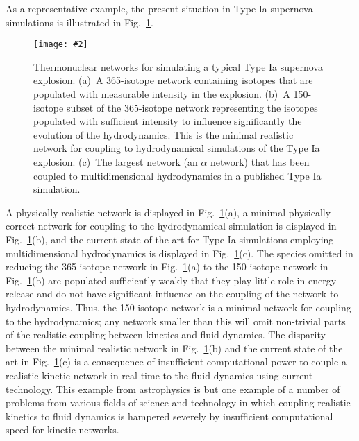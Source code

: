 \documentclass[]{elsart}
\newlength{\figdn}
\newcommand{\fig}[1]{Fig.~\ref{fig:#1}}
\newcommand{\singlefig}[6]{%
\begin{figure} \vspace{#3}%
\begin{flushright}%
\texttt{[image: \#2]}%
\end{flushright}%
\caption{\label{fig:#1} #6}%
\vspace{#4}%
\end{figure}}
\begin{document}
As a representative example, the present situation in Type Ia supernova simulations is
illustrated in \fig{networks}.
%
%
\singlefig
{networks}
{figures/networks-365-150-13.eps}
{0pt}
{\figdn}
{0.46}
{Thermonuclear networks for simulating a typical Type Ia supernova explosion. (a)~A
365-isotope network containing  isotopes that are populated with measurable
intensity in the  explosion.  (b)~A 150-isotope subset of the 365-isotope
network representing the isotopes populated with sufficient intensity to influence
significantly the evolution of the hydrodynamics.  This is the minimal realistic network
for coupling to hydrodynamical simulations of the Type Ia explosion.  (c)~The largest
network (an $\alpha$ network) that has been coupled to multidimensional 
hydrodynamics in a published Type Ia
simulation.}
%
%
A physically-realistic network is displayed in \fig{networks}(a), a minimal
physically-correct network for coupling to the hydrodynamical simulation is displayed in 
\fig{networks}(b), and the current state of the art for Type Ia simulations employing
multidimensional hydrodynamics is displayed in \fig{networks}(c). The species omitted in
reducing the 365-isotope network in \fig{networks}(a) to the 150-isotope network in
\fig{networks}(b) are populated sufficiently weakly that they play little role in
energy release and do not have significant influence on the coupling of the network to
hydrodynamics.  Thus, the 150-isotope network is a minimal network for coupling to the
hydrodynamics;  any network smaller than this will omit non-trivial parts of the realistic
coupling between kinetics and fluid dynamics.  The disparity between the minimal realistic
network in \fig{networks}(b) and the current state of the art in \fig{networks}(c) is a
consequence of insufficient computational power to couple a realistic kinetic network in
real time to the fluid dynamics using current technology. This example from astrophysics
is but one example of a number of problems from various fields of science and technology
in which coupling realistic kinetics to fluid dynamics is hampered severely by
insufficient computational speed for kinetic networks. 
\end{document}

